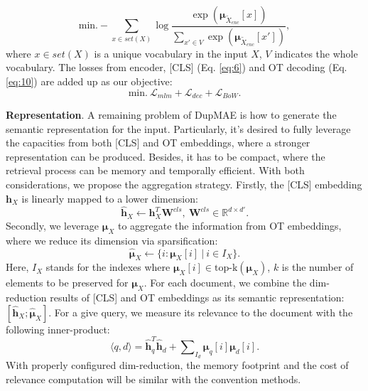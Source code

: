 \documentclass[11pt,a4paper]{article}
\begin{document}
\begin{equation}\label{eq:10}
    \mathrm{min}. - \sum_{x \in set(X)} \log 
    \frac{\exp(\boldsymbol{\mu}_{\tilde{X}_{enc}}[x])}
    {\sum_{x' \in V} \exp(\boldsymbol{\mu}_{\tilde{X}_{enc}}[x'])},
\end{equation}
where $x\in set(X)$ is a unique vocabulary in the input $X$, $V$ indicates the whole vocabulary. The losses from encoder, [CLS] (Eq. \ref{eq:6}) and OT decoding (Eq. \ref{eq:10}) are added up as our objective: 
\begin{equation}\label{eq:11}
    \mathrm{min}. ~ \mathcal{L}_{mlm} + \mathcal{L}_{dec} + \mathcal{L}_{BoW}.
\end{equation}

\textbf{Representation}. A remaining problem of DupMAE is how to generate the semantic representation for the input. Particularly, it's desired to fully leverage the capacities from both [CLS] and OT embeddings, where a stronger representation can be produced. Besides, it has to be compact, where the retrieval process can be memory and temporally efficient. With both considerations, we propose the aggregation strategy. Firstly, the [CLS] embedding $\mathbf{h}_X$ is linearly mapped to a lower dimension: 
\begin{equation}\label{eq:12} 
    \mathbf{\hat{h}}_X \leftarrow \mathbf{h}_X^T \mathbf{W}^{cls}, ~
    \mathbf{W}^{cls} \in \mathbb{R}^{d \times d'}.
\end{equation}
Secondly, we leverage $\boldsymbol{\mu}_{X}$ to aggregate the information from OT embeddings, where we reduce its dimension via sparsification: 
\begin{equation}\label{eq:13}
    \boldsymbol{\hat{\mu}}_{X} 
    \leftarrow
    \{i: \boldsymbol{\mu}_{X}[i] ~| ~ i \in 
    I_X \}.
\end{equation}
Here, $I_X$ stands for the indexes where $\boldsymbol{\mu}_{X}[i] \in \text{top-k}(\boldsymbol{\mu}_{X})$, $k$ is the number of elements to be preserved for $\boldsymbol{\mu}_{X}$. For each document, we combine the dim-reduction results of [CLS] and OT embeddings as its semantic representation: $[\mathbf{\hat{h}}_X; \boldsymbol{\hat{\mu}}_{X}]$. For a give query, we measure its relevance to the document with the following inner-product: 
\begin{equation}\label{eq:14} 
    \langle q,d \rangle = \mathbf{\hat{h}}_q^T \mathbf{\hat{h}}_d + 
    \sum\nolimits_{I_d} \boldsymbol{\mu}_q[i] \boldsymbol{\mu}_d[i].
\end{equation} 
With properly configured dim-reduction, the memory footprint and the cost of relevance computation will be similar with the convention methods.  
\end{document}
